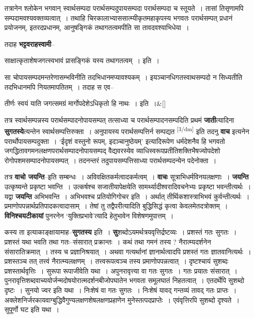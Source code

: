 \documentclass[article,12pt,a4paper]{memoir}
\begin{document}
	  \pstart तत्रानेन श्लोकेन भगवान् स्वार्थसम्पदा परार्थसम्पदुपायसम्पदा परार्थसम्पदा च स्तूयते । तासां तिसृणामपि सम्पदामवश्यवक्तव्यत्वात् । तथाहि चिरकालाभ्याससात्म्यीकृतमहाकृपस्य भगवतः परार्थसम्पत् प्रधानं प्रयोजनम्, इतरदप्रधानम्, आनुषङ्गिकं तथागतत्वमपीति सा तावदवश्याभिधेया ।
	\pend
      

	  \pstart तदाह \textbf{भट्टवराहस्वामी}--
	\pend
      

	  \pstart साक्षात्कृताशेषजगत्स्वभावं प्रासङ्गिकं यस्य तथागतत्वम् । इति ।
	\pend
      

	  \pstart सा चोपायसम्पदमन्तरेणासम्भविनीति तदभिधानमप्यावश्यकम् । इयञ्चानधिगतस्वाथसम्पदो न सिध्यतीति तदभिधानमपि नियतमापतितम् । तदाह स एव--
	\pend
      
	    
	    \stanza[\smallbreak]
तीर्णः स्वयं याति जगत्समग्रं मार्गोपदेशेऽधिकृतो हि नाथः । इति ।\&[\smallbreak]


	

	  \pstart तत्र स्वार्थसम्पन्नस्य परार्थसम्पादनोपायसम्पत् तत्साध्या च परार्थसम्पादनसम्पदिति प्रथमं \textbf{जाती}त्यादिना \textbf{सुगतस्ये}त्यन्तेन स्वार्थसम्पत्तिरुक्ता । अनुपायस्य परार्थसम्पत्तिर्न सम्पद्यत \leavevmode\textsuperscript{\rmlatinfont\tiny [3/dm]} इति तदनु \textbf{वाच} इत्यनेन परार्थोपायसम्पदुक्ता । ‘ईदृशं वस्तुनो रूपम्, इदञ्चानुष्ठेयम्’ इत्यादिरूपेण धर्मदेशनैव हि भगवतो जगद्धितावगमनलक्षणपरार्थसम्पादनोपायसम्पद् वैद्यवरस्येव व्याधिस्वरूपप्रतीतिशक्तिभैषज्योपदेशो रोगोपशमसम्पादनोपायसम्पत् । तदनन्तरं तदुपायसम्पत्तिसाध्या परार्थसम्पदन्येन पदेनोक्ता ।
	\pend
      

	  \pstart तत्र \textbf{वाचो जयन्ति}--इति सम्बन्धः । अविवक्षितकर्मत्वादकर्मत्वम् । \textbf{वाचः} सूत्राभिधर्मविनयलक्षणाः । \textbf{जयन्ति} उत्कृष्यन्ते प्रकृष्टा भवन्ति । उत्कर्षश्च सजातीयापेक्षयेति सामर्थ्यादीश्वरादिवचनेभ्यः प्रकृष्टा भवन्तीत्यर्थः । यद्वा \textbf{जयन्ति} अभिभवन्ति । अभिभवश्च प्रतियोगिगोचर इति । अर्थात् तीर्थिकशास्त्राभिभवं कुर्वन्तीत्यर्थः । प्रमाणोपपन्नार्थप्रतिपादकत्वादासाम् । तेषां तु तद्वैपरीत्यादिति बुद्धिसिद्धं कृत्वा केवलमेतदत्रोक्तम् । \textbf{विनिश्चयटीकायां} पुनरनेन ‘युक्तिप्रभावे’त्यादि हेतुभावेन विशेषणमुपात्तम् ।
	\pend
      

	  \pstart कस्य ता इत्याकाङ्क्षायामाह--\textbf{सुगतस्य} इति । \textbf{सु}शब्दोऽयमर्थत्रयवृत्तिर्द्रष्टव्यः । प्रशस्तं गतः सुगतः । प्रशस्तं यथा भवति तथा गतः--संसारात् प्रक्रान्तः । कथं तथा गमनं तस्य ? नैरात्म्यदर्शनेन संसारातिक्रमात् । तस्य च प्रज्ञानिश्रयात् । अथवा गत्यर्थानां ज्ञानार्थत्वादपि प्रशस्तं गतः ज्ञातवानित्यर्थः । प्रशस्तञ्च तत् तत्त्वं नैरात्म्यलक्षणम् । तत्त्वरूपत्वञ्च तस्य प्रमाणोपपन्नत्वात् । दृष्टश्चायं सुशब्दः प्रशस्तार्थवृत्तिः । सुरूपा रूपाजीवेति यथा । अपुनरावृत्त्या वा गतः सुगतः । गतः प्रयातः संसारात् । पुनरावृत्तिशब्दवाच्ययोर्जन्मदोषयोरात्मदर्शनबीजोपघातेन भगवता समूलघातं निहतत्वात् । एतदर्थेपि सुशब्दो दृष्टः । सुनयो ज्वर इति यथा । निःशेषं वा गतः सुगतः । निःशेषं यावद् गन्तव्यं तावद् गतः प्राप्तः । अक्लेशनिर्जरकायवाग्बुद्धिवैगुण्यलक्षणशेषलक्षणप्रहाणेन मुनेस्तत्पदप्राप्तेः । एवंवृत्तिरपि सुशब्दो दृश्यते । सुपूर्णो घट इति यथा ।
	\pend
      
\end{document}
